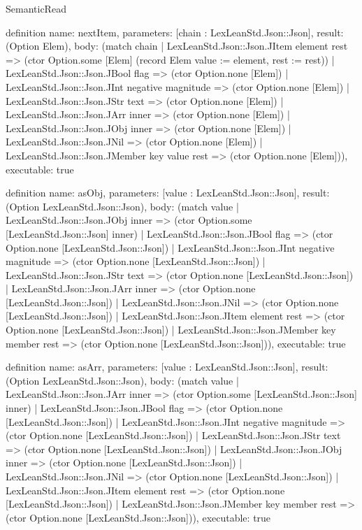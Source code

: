 \begin{lexlean}{SemanticRead}
\begin{semanticmodule}
definition{
  name: nextItem,
  parameters: [chain : LexLeanStd.Json::Json],
  result: (Option Elem),
  body: (match chain
    | LexLeanStd.Json::Json.JItem element rest => (ctor Option.some [Elem] (record Elem {value := element, rest := rest}))
    | LexLeanStd.Json::Json.JBool flag => (ctor Option.none [Elem])
    | LexLeanStd.Json::Json.JInt negative magnitude => (ctor Option.none [Elem])
    | LexLeanStd.Json::Json.JStr text => (ctor Option.none [Elem])
    | LexLeanStd.Json::Json.JArr inner => (ctor Option.none [Elem])
    | LexLeanStd.Json::Json.JObj inner => (ctor Option.none [Elem])
    | LexLeanStd.Json::Json.JNil => (ctor Option.none [Elem])
    | LexLeanStd.Json::Json.JMember key value rest => (ctor Option.none [Elem])),
  executable: true
}

definition{
  name: asObj,
  parameters: [value : LexLeanStd.Json::Json],
  result: (Option LexLeanStd.Json::Json),
  body: (match value
    | LexLeanStd.Json::Json.JObj inner => (ctor Option.some [LexLeanStd.Json::Json] inner)
    | LexLeanStd.Json::Json.JBool flag => (ctor Option.none [LexLeanStd.Json::Json])
    | LexLeanStd.Json::Json.JInt negative magnitude => (ctor Option.none [LexLeanStd.Json::Json])
    | LexLeanStd.Json::Json.JStr text => (ctor Option.none [LexLeanStd.Json::Json])
    | LexLeanStd.Json::Json.JArr inner => (ctor Option.none [LexLeanStd.Json::Json])
    | LexLeanStd.Json::Json.JNil => (ctor Option.none [LexLeanStd.Json::Json])
    | LexLeanStd.Json::Json.JItem element rest => (ctor Option.none [LexLeanStd.Json::Json])
    | LexLeanStd.Json::Json.JMember key member rest => (ctor Option.none [LexLeanStd.Json::Json])),
  executable: true
}

definition{
  name: asArr,
  parameters: [value : LexLeanStd.Json::Json],
  result: (Option LexLeanStd.Json::Json),
  body: (match value
    | LexLeanStd.Json::Json.JArr inner => (ctor Option.some [LexLeanStd.Json::Json] inner)
    | LexLeanStd.Json::Json.JBool flag => (ctor Option.none [LexLeanStd.Json::Json])
    | LexLeanStd.Json::Json.JInt negative magnitude => (ctor Option.none [LexLeanStd.Json::Json])
    | LexLeanStd.Json::Json.JStr text => (ctor Option.none [LexLeanStd.Json::Json])
    | LexLeanStd.Json::Json.JObj inner => (ctor Option.none [LexLeanStd.Json::Json])
    | LexLeanStd.Json::Json.JNil => (ctor Option.none [LexLeanStd.Json::Json])
    | LexLeanStd.Json::Json.JItem element rest => (ctor Option.none [LexLeanStd.Json::Json])
    | LexLeanStd.Json::Json.JMember key member rest => (ctor Option.none [LexLeanStd.Json::Json])),
  executable: true
}


\end{semanticmodule}
\end{lexlean}
